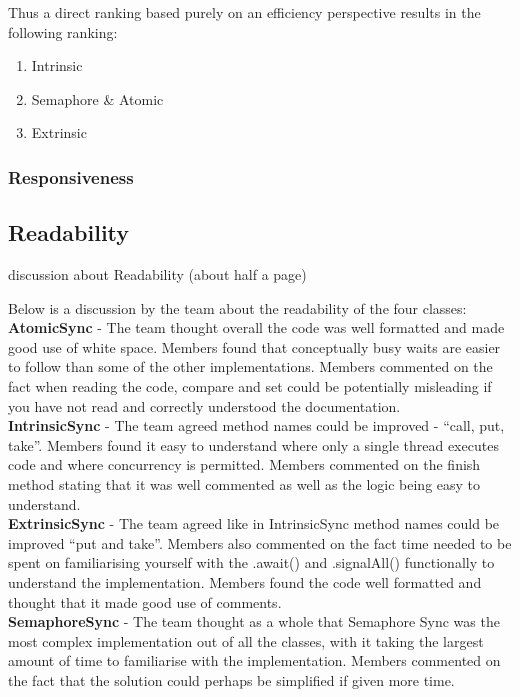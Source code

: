\documentclass[11pt]{article}
\begin{document}
Thus a direct ranking based purely on an efficiency perspective results in the following ranking: 

\begin{enumerate}
	\item Intrinsic
	\item Semaphore \& Atomic
	\item Extrinsic
\end{enumerate}

\subsubsection{Responsiveness}




\pagebreak
\subsection{Readability}
discussion about  Readability (about half a page)

Below is a discussion by the team about the readability of the four classes: \\

\textbf{AtomicSync} - The team thought overall the code was well formatted and made good use of white space. Members found that conceptually busy waits are easier to follow than some of the other implementations. Members commented on the fact when reading the code, compare and set could be potentially misleading if you have not read and correctly understood the documentation.\\

\textbf{IntrinsicSync} - The team agreed method names could be improved - “call, put, take”. Members found it easy to understand where only a single thread executes code and where concurrency is permitted. Members commented on the finish method stating that it was well commented as well as the logic being easy to understand. \\

\textbf{ExtrinsicSync} - The team agreed like in IntrinsicSync method names could be improved “put and take”. Members also commented on the fact time needed to be spent on familiarising yourself with the .await() and .signalAll() functionally to understand the implementation. Members found the code well formatted and thought that it made good use of comments. \\

\textbf{SemaphoreSync} - The team thought as a whole that Semaphore Sync was the most complex implementation out of all the classes, with it taking the largest amount of time to familiarise with the implementation. Members commented on the fact that the solution could perhaps be simplified if given more time.  \\
\end{document}
